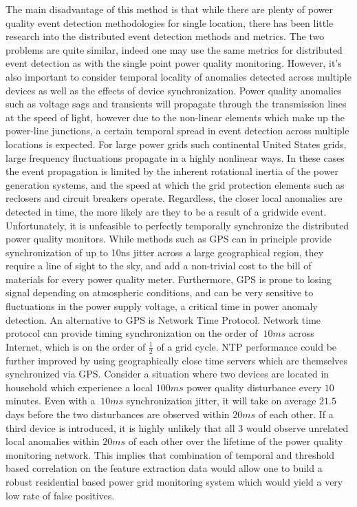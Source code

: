 The main disadvantage of this method is that while there are plenty of power quality event detection methodologies for single location, there has been little research into the distributed event detection methods and metrics.
The two problems are quite similar, indeed one may use the same metrics for distributed event detection as with the single point power quality monitoring.
However, it's also important to consider temporal locality of anomalies detected across multiple devices as well as the effects of device synchronization.
Power quality anomalies such as voltage sags and transients will propagate through the transmission lines at the speed of light, however due to the non-linear elements which make up the power-line junctions, a certain temporal spread in event detection across multiple locations is expected.
For large power grids such continental United States grids, large frequency fluctuations propagate in a highly nonlinear ways.
In these cases the event propagation is limited by the inherent rotational inertia of the power generation systems, and the speed at which the grid protection elements such as reclosers and circuit breakers operate.
Regardless, the closer local anomalies are detected in time, the more likely are they to be a result of a gridwide event.
Unfortunately, it is unfeasible to perfectly temporally synchronize the distributed power quality monitors.
While methods such as GPS can in principle provide synchronization of up to 10ns jitter across a large geographical region, they require a line of sight to the sky, and add a non-trivial cost to the bill of materials for every power quality meter.
Furthermore, GPS is prone to losing signal depending on atmospheric conditions, and can be very sensitive to fluctuations in the power supply voltage, a critical time in power anomaly detection.
An alternative to GPS is Network Time Protocol.
Network time protocol can provide timing synchronization on the order of $~10ms$ across Internet, which is on the order of $\frac{1}{2}$ of a grid cycle.
NTP performance could be further improved by using geographically close time servers which are themselves synchronized via GPS. Consider a situation where two devices are located in household which experience a local $100ms$ power quality disturbance every $10$ minutes.
Even with a $~10ms$ synchronization jitter, it will take on average $21.5$ days before the two disturbances are observed within $20ms$ of each other.
If a third device is introduced, it is highly unlikely that all 3 would observe unrelated local anomalies within $20ms$ of each other over the lifetime of the power quality monitoring network.
This implies that combination of temporal and threshold based correlation on the feature extraction data would allow one to build a robust residential based power grid monitoring system which would yield a very low rate of false positives.

